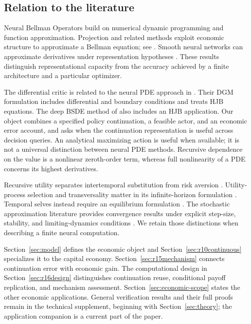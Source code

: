 \subsection{Relation to the literature}
Neural Bellman Operators build on numerical dynamic programming and function approximation. Projection and related methods exploit economic structure to approximate a Bellman equation; see \citet{judd1998}. Smooth neural networks can approximate derivatives under representation hypotheses \citep{hornik1990}. These results distinguish representational capacity from the accuracy achieved by a finite architecture and a particular optimizer.

The differential critic is related to the neural PDE approach in \citet{sirignano2018}. Their DGM formulation includes differential and boundary conditions and treats HJB equations. The deep BSDE method of \citet{han2018} also includes an HJB application. Our object combines a specified policy continuation, a feasible actor, and an economic error account, and asks when the continuation representation is useful across decision queries. An analytical maximizing action is useful when available; it is not a universal distinction between neural PDE methods. Recursive dependence on the value is a nonlinear zeroth-order term, whereas full nonlinearity of a PDE concerns its highest derivatives.

Recursive utility separates intertemporal substitution from risk aversion \citep{epsteinzin1989,duffieepstein1992}. Utility-process selection and transversality matter in its infinite-horizon formulation \citep{herdegen2021}. Temporal selves instead require an equilibrium formulation \citep{bjork2016}. The stochastic approximation literature provides convergence results under explicit step-size, stability, and limiting-dynamics conditions \citep{borkar2024}. We retain those distinctions when describing a finite neural computation.

Section~\ref{sec:model} defines the economic object and Section~\ref{sec:r10continuous} specializes it to the capital economy. Section~\ref{sec:r15mechanism} connects continuation error with economic gain. The computational design in Section~\ref{sec:r16design} distinguishes continuation reuse, conditional payoff replication, and mechanism assessment. Section~\ref{sec:economic-scope} states the other economic applications. General verification results and their full proofs remain in the technical supplement, beginning with Section~\ref{sec:theory}; the application companion is a current part of the paper.
